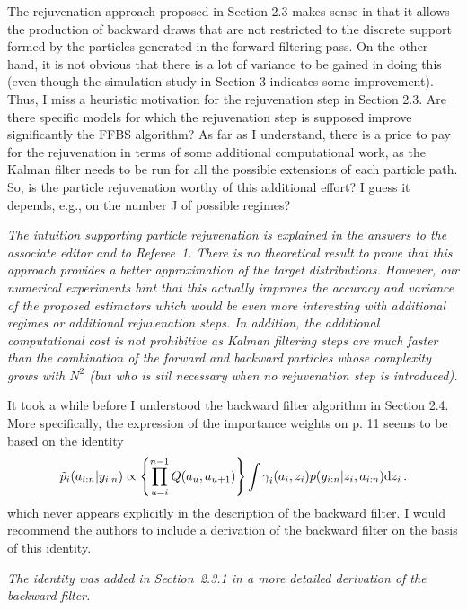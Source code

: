 \vspace{.5cm}

\noindent The rejuvenation approach proposed in Section 2.3 makes sense in that it allows the
production of backward draws that are not restricted to the discrete support formed by the particles generated in the forward  filtering pass. On the other hand, it is not obvious that there is a lot of variance to be gained in doing this (even though the simulation study in Section 3 indicates some improvement). Thus, I miss a heuristic
motivation for the rejuvenation step in Section 2.3. Are there specific models for which the rejuvenation step is supposed improve significantly the FFBS algorithm? As far as I understand, there is a price to pay for the rejuvenation in terms of some additional computational work, as the Kalman filter needs to be run for all the possible extensions
of each particle path. So, is the particle rejuvenation worthy of this additional effort? I guess it depends, e.g., on the number J of possible regimes?

\vspace{.2cm}
{\em
\noindent The intuition supporting particle rejuvenation is explained in the answers to the associate editor and to Referee~1. There is no theoretical result to prove that this approach provides a better approximation of the target distributions. However, our numerical experiments hint that this actually improves the accuracy and variance of the proposed estimators which would be even more interesting with additional regimes or additional rejuvenation steps. In addition, the additional computational cost is not prohibitive as Kalman filtering steps are much faster than the combination of the forward and backward particles whose complexity grows with $N^2$ (but who is stil necessary when no rejuvenation step is introduced).
}

\vspace{.5cm}

\noindent It took a while before I understood the backward filter algorithm in Section 2.4. More
specifically, the expression of the importance weights on p. 11 seems to be based on
the identity
\[
\tilde{p}_{i}(a_{i:n}|y_{i:n}) \propto \left\{\prod_{u=i}^{n-1}Q(a_u,a_{u+1})\right\} \int \gamma^{}_{i}(a_i,z_i) p(y_{i:n}|z_i,a_{i:n})\mathrm{d} z_i\,.
\]
which never appears explicitly in the description of the backward  filter. I would recommend
the authors to include a derivation of the backward filter on the basis of this identity.

\vspace{.2cm}
{\em
\noindent The identity was added in Section~2.3.1 in a more detailed derivation of the backward filter.
}


